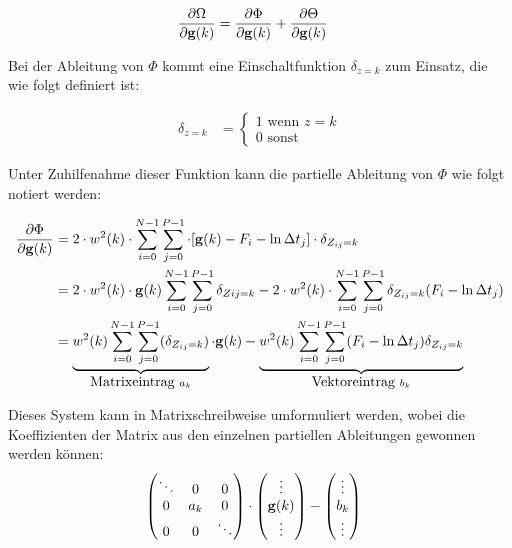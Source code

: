 \begin{align}
\label{eq:energy:partial}
\frac{\partial \Omega}{\partial \mathbf g(k)} 
	& = \frac{\partial \Phi}{\partial \mathbf g(k)} +\frac{\partial \Theta}{\partial \mathbf g(k)}
\end{align}
	
	Bei der Ableitung von $\Phi$ kommt eine Einschaltfunktion $\delta_{z=k}$ zum Einsatz, die wie folgt definiert ist:

\begin{align}
	\delta_{z=k} &= \begin{cases}
    		1 \mbox{ wenn } z = k\\
	    0 \mbox{ sonst}
    \end{cases}
\end{align}

Unter Zuhilfenahme dieser Funktion kann die partielle Ableitung von $\Phi$ wie folgt notiert werden:

\begin{align}
\frac{\partial \Phi}{\partial \mathbf g(k)} 
	&= 2\cdot w^2(k) \cdot \sum \limits_{i=0}^{N-1} \sum \limits_{j=0}^{P-1} \cdot[\mathbf g(k) - F_i - \ln \Delta t_j]\cdot \delta_{Z_{ij}=k}\\
&=2\cdot w^2(k) \cdot \mathbf g(k) \sum \limits_{i=0}^{N-1} \sum \limits_{j=0}^{P-1}\delta_{Z{ij}=k} - 2\cdot w^2(k)\cdot\sum \limits_{i=0}^{N-1} \sum \limits_{j=0}^{P-1}\delta_{Z_{ij}=k}(F_i - \ln \Delta t_j)\\
\label{eq:1}
 &= \underbrace{
        w^2(k) \sum_{i=0}^{N-1} \sum_{j=0}^{P-1}(\delta_{Z_{ij}=k})
    }_{\mbox{Matrixeintrag }a_k} 
    \cdot \mathbf g(k) - 
    \underbrace{
        w^2(k) \sum_{i=0}^{N-1} \sum_{j=0}^{P-1}(F_i - \ln \Delta t_j)\delta_{Z_{ij}=k}
    }_{\mbox{Vektoreintrag }b_k}
\end{align}
    
Dieses System kann in Matrixschreibweise umformuliert werden, wobei die Koeffizienten der Matrix aus den einzelnen partiellen Ableitungen gewonnen werden können:
    \begin{align}
    \label{eq:matrix:data}
&
\begin{pmatrix}
\ddots & 0& 0\\
0 & a_k & 0\\
0 & 0 & \ddots
\end{pmatrix}
 \cdot \begin{pmatrix}
 \vdots\\
 \mathbf g(k)\\
 \vdots
 \end{pmatrix} - 
\begin{pmatrix}
 \vdots\\
 b_k\\
 \vdots
 \end{pmatrix} 
\end{align}


